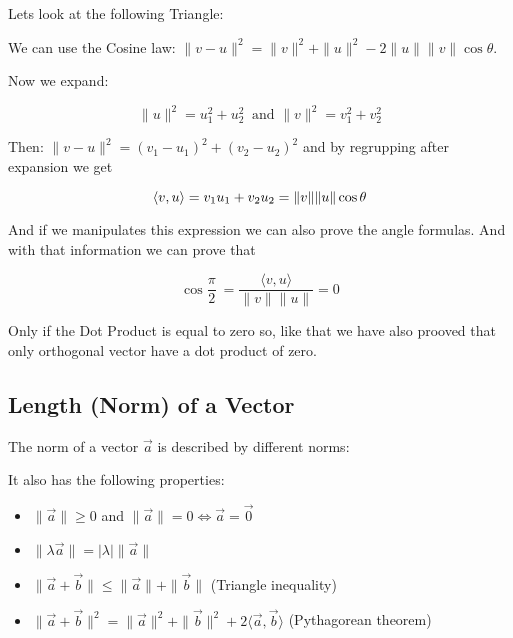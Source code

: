 Lets look at the following Triangle:
\begin{center}
\end{center}

We can use the Cosine law: \(\|v - u\|^{2} = \|v\|^2 + \|u\|^2  - 2 \|u\| \|v\| \cos\theta\).

 Now we expand:

\[
\|u\|^2 = u_{1}^2 + u_{2}^2\ \text{ and } \|v\|^2 = v_{1}^2 + v_{2}^2
\]

Then: \(\|v - u\|^2 = (v_1 - u_1)^2 + (v_2 - u_2)^2\) and by regrupping after expansion we get

\[\langle v, u\rangle = v_1u_1 + v_2u_2 = \|v\|\|u\|\cos \theta \\ 
\]

\QED

And if we manipulates this expression we can also prove the angle formulas.
And with that information we can prove that

\[\cos \frac{\pi}{2}\ = \frac{\langle v, u\rangle}{\|v\|\|u\|} = 0\]

Only if the Dot Product is equal to zero so, like that we have also prooved that
only orthogonal vector have a dot product of zero.

\subsection{Length (Norm) of a Vector}
The norm of a vector \(\vec{a}\) is described by different norms:

It also has the following properties:

\begin{itemize}[label=\(-\)]
	\item \(\|\vec{a}\| \geq 0\) and \(\|\vec{a}\| = 0 \Leftrightarrow \vec{a} = \vec{0}\)
	\item \(\|\lambda \vec{a}\| = |\lambda| \|\vec{a}\|\)
	\item \(\|\vec{a} + \vec{b}\| \leq \|\vec{a}\| + \|\vec{b}\|\) (Triangle inequality)
	\item \(\|\vec{a} + \vec{b}\|^2 = \|\vec{a}\|^2 + \|\vec{b}\|^2 + 2\langle\vec{a}, \vec{b}\rangle\) (Pythagorean theorem)
\end{itemize}

